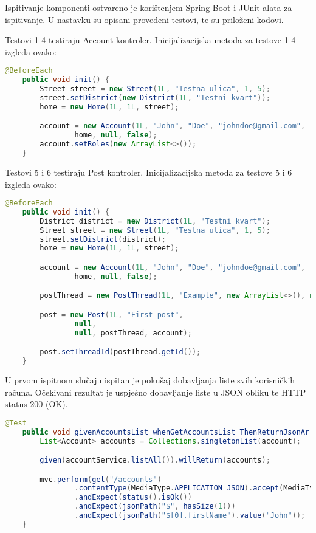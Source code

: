 			Ispitivanje komponenti ostvareno je korištenjem Spring Boot i JUnit alata za ispitivanje.
			U nastavku su opisani provedeni testovi, te su priloženi kodovi.

			Testovi 1-4 testiraju Account kontroler.
			Inicijalizacijska metoda za testove 1-4 izgleda ovako:

			\begin{lstlisting}[language=Java, breaklines=true]
    @BeforeEach
    public void init() {
        Street street = new Street(1L, "Testna ulica", 1, 5);
        street.setDistrict(new District(1L, "Testni kvart"));
        home = new Home(1L, 1L, street);

        account = new Account(1L, "John", "Doe", "johndoe@gmail.com", "pass123",
                home, null, false);
        account.setRoles(new ArrayList<>());
    }
			\end{lstlisting}

			Testovi 5 i 6 testiraju Post kontroler.
			Inicijalizacijska metoda za testove 5 i 6 izgleda ovako:

			\begin{lstlisting}[language=Java, breaklines=true]
    @BeforeEach
    public void init() {
        District district = new District(1L, "Testni kvart");
        Street street = new Street(1L, "Testna ulica", 1, 5);
        street.setDistrict(district);
        home = new Home(1L, 1L, street);

        account = new Account(1L, "John", "Doe", "johndoe@gmail.com", "pass123",
                home, null, false);

        postThread = new PostThread(1L, "Example", new ArrayList<>(), null, district);

        post = new Post(1L, "First post",
                null,
                null, postThread, account);

        post.setThreadId(postThread.getId());
    }
			\end{lstlisting}

			U prvom ispitnom slučaju ispitan je pokušaj dobavljanja liste svih korisničkih računa.
			Očekivani rezultat je uspješno dobavljanje liste u JSON obliku te HTTP status 200 (OK).

			\begin{lstlisting}[language=Java, breaklines=true]
    @Test
    public void givenAccountsList_whenGetAccountsList_ThenReturnJsonArray() throws Exception {
        List<Account> accounts = Collections.singletonList(account);

        given(accountService.listAll()).willReturn(accounts);

        mvc.perform(get("/accounts")
                .contentType(MediaType.APPLICATION_JSON).accept(MediaType.APPLICATION_JSON))
                .andExpect(status().isOk())
                .andExpect(jsonPath("$", hasSize(1)))
                .andExpect(jsonPath("$[0].firstName").value("John"));
    }
			\end{lstlisting}

